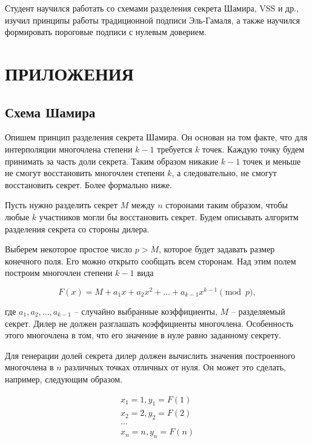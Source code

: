 \documentclass[a4paper,12pt]{article}
\theoremstyle{definition}
\begin{document}
	Студент научился работать со схемами разделения секрета Шамира, VSS и др., изучил принципы работы традиционной подписи Эль-Гамаля, а также научился формировать пороговые подписи с нулевым доверием. 
	
	
	
	\newpage
	\printbibliography[title={БИБЛИОГРАФИЧЕСКИЙ СПИСОК}]
	
	\newpage
	\section*{ПРИЛОЖЕНИЯ}
	
	\renewcommand\thesubsection{\Asbuk{subsection}}
		
		\subsection{Схема Шамира} \label{applic:Shamir}
		
		Опишем принцип разделения секрета Шамира. Он основан на том факте, что для интерполяции многочлена степени $k-1$ требуется $k$ точек. Каждую точку будем принимать за часть доли секрета. Таким образом никакие $k-1$ точек и меньше не смогут восстановить многочлен степени $k$, а следовательно, не смогут восстановить секрет. Более формально ниже.
		
		Пусть нужно разделить секрет $M$ между $n$ сторонами таким образом, чтобы любые $k$ участников могли бы восстановить секрет. Будем описывать алгоритм разделения секрета со стороны дилера. 
		
		Выберем некоторое простое число $p>M$, которое будет задавать размер конечного поля. Его можно открыто сообщать всем сторонам. Над этим полем построим многочлен степени $k-1$ вида
		
		\[ F(x) = M + a_1 x + a_2 x^2 + \dots + a_{k-1} x^{k-1} \pmod p, \]
		
		где $a_1, a_2, \dots, a_{k-1}$ \--- случайно выбранные коэффициенты, $M$ \--- разделяемый секрет. Дилер не должен разглашать коэффициенты многочлена. Особенность этого многочлена в том, что его значение в нуле равно заданному секрету.
		
		Для генерации долей секрета дилер должен вычислить значения построенного многочлена в $n$ различных точках отличных от нуля. Он может это сделать, например, следующим образом.
		
		\begin{gather*}
			x_1=1, y_1 = F(1) \\
			x_2=2, y_2 = F(2) \\
			\dots 			  \\
			x_n=n, y_n = F(n) \\
		\end{gather*}
		
\end{document}
